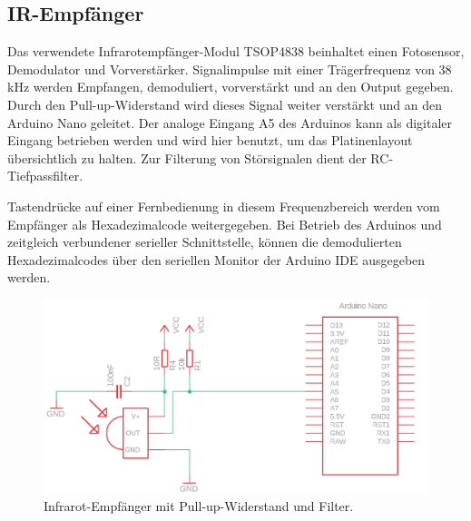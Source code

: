 \documentclass[11pt, titlepage]{report}
\begin{document}
			\subsection{IR-Empfänger}
			\label{sec:IR}
				Das verwendete Infrarotempfänger-Modul TSOP4838 beinhaltet einen Fotosensor, Demodulator und Vorverstärker. Signalimpulse mit einer Trägerfrequenz von 38 kHz werden Empfangen, demoduliert, vorverstärkt und an den Output gegeben. Durch den Pull-up-Widerstand wird dieses Signal weiter verstärkt und an den Arduino Nano geleitet. Der analoge Eingang A5 des Arduinos kann als digitaler Eingang betrieben werden und wird hier benutzt, um das Platinenlayout übersichtlich zu halten. Zur Filterung von Störsignalen dient der RC-Tiefpassfilter.

				Tastendrücke auf einer Fernbedienung in diesem Frequenzbereich werden vom Empfänger als Hexadezimalcode weitergegeben. Bei Betrieb des Arduinos und zeitgleich verbundener serieller Schnittstelle, können die demodulierten Hexadezimalcodes über den seriellen Monitor der Arduino IDE ausgegeben werden.

				\hspace{5em}
				\begin{figure}[htbp]
					\centering
					\includegraphics[width=\linewidth]{./img/ir.png}
					\caption{ Infrarot-Empfänger mit Pull-up-Widerstand und Filter.
					\label{fig:imgIR}}
				\end{figure}
			\newpage	
\end{document}
